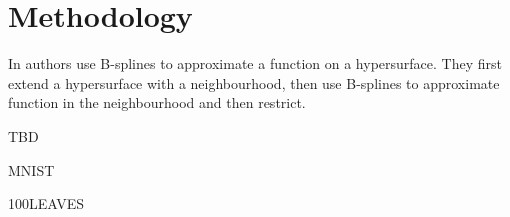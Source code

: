 \section{Methodology}\label{sec:METHOD}




In \cite{AmbientApproxHyper} authors use B-splines to approximate a function on a hypersurface. They first extend a hypersurface with a neighbourhood, then use B-splines to approximate function in the neighbourhood and then restrict.

TBD \cite{ScatteredDataInterpolation}



MNIST \cite{mnist}

100LEAVES \cite{100leaves}











